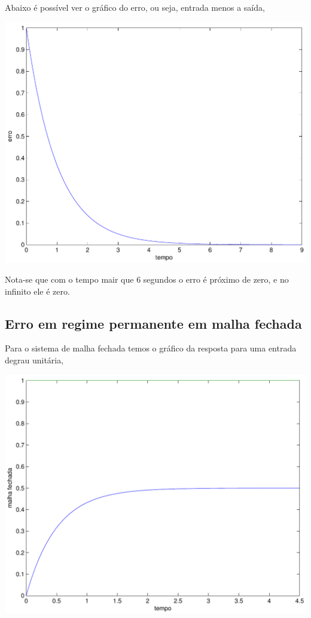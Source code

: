 \documentclass[paper=a4, fontsize=11pt]{article}
\begin{document}
Abaixo é possível ver o gráfico do erro, ou seja, entrada menos a saída,

\begin{center}
    \includegraphics[scale=0.5]{q7iaerro.pdf}
\end{center}

Nota-se que com o tempo mair que 6 segundos o erro é próximo de zero, e no infinito
ele é zero.

\newpage

\subsection{Erro em regime permanente em malha fechada}

Para o sistema de malha fechada temos o gráfico da resposta para uma entrada
degrau unitária,

\begin{center}
    \includegraphics[scale=0.5]{q7ibre.pdf}
\end{center}
\end{document}
